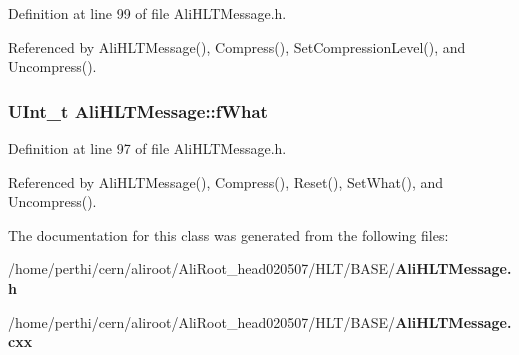 Definition at line 99 of file Ali\-HLTMessage.h.

Referenced by Ali\-HLTMessage(), Compress(), Set\-Compression\-Level(), and Uncompress().
\subsubsection{\setlength{\rightskip}{0pt plus 5cm}UInt\_\-t {\bf Ali\-HLTMessage::f\-What}\hspace{0.3cm}{\tt  [private]}}\label{classAliHLTMessage_r0}




Definition at line 97 of file Ali\-HLTMessage.h.

Referenced by Ali\-HLTMessage(), Compress(), Reset(), Set\-What(), and Uncompress().

The documentation for this class was generated from the following files:\begin{CompactItemize}
\item 
/home/perthi/cern/aliroot/Ali\-Root\_\-head020507/HLT/BASE/{\bf Ali\-HLTMessage.h}\item 
/home/perthi/cern/aliroot/Ali\-Root\_\-head020507/HLT/BASE/{\bf Ali\-HLTMessage.cxx}\end{CompactItemize}

